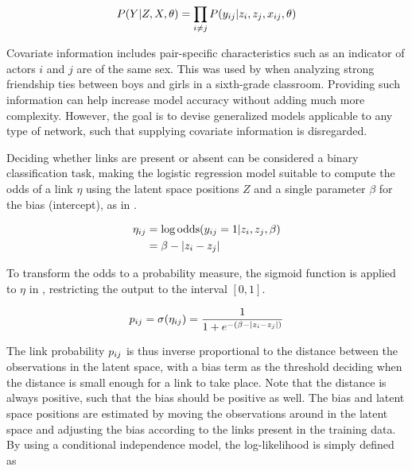         \begin{equation}\label{eq:lsm-link-proba}
            P(Y|Z,X,\theta) = \prod_{i\neq j} P(\sub(y)|z_i,z_j,\sub(x),\theta)
        \end{equation}
        
        Covariate information includes pair-specific characteristics such as an indicator of actors $i$ and $j$ are of the same sex. This was used by \citeauthor*{hoff2002latent} when analyzing strong friendship ties between boys and girls in a sixth-grade classroom. Providing such information can help increase model accuracy without adding much more complexity. However, the goal is to devise generalized models applicable to any type of network, such that supplying covariate information is disregarded. 
        
        Deciding whether links are present or absent can be considered a binary classification task, making the logistic regression model suitable to compute the odds of a link $\eta$ using the latent space positions $Z$ and a single parameter $\beta$ for the bias (intercept), as in .
        
        \begin{equation}\label{eq:lsm-link-odds}
            \begin{split}
                \sub(\eta) &= \log \odds(\sub(y)=1|z_i,z_j,\beta) \\
                           &= \beta - |z_i-z_j|
            \end{split}
        \end{equation}
        
        To transform the odds to a probability measure, the sigmoid function is applied to $\eta$ in , restricting the output to the interval $[0,1]$.
        
        \begin{equation}\label{eq:lsm-link-sigmoid}
            \sub(p) = \sigma(\sub(\eta)) = \frac{1}{1 + e^{-(\beta - |z_i-z_j|)}}
        \end{equation}
        
        The link probability $\sub(p)$ is thus inverse proportional to the distance between the observations in the latent space, with a bias term as the threshold deciding when the distance is small enough for a link to take place. Note that the distance is always positive, such that the bias should be positive as well. 
        The bias and latent space positions are estimated by moving the observations around in the latent space and adjusting the bias according to the links present in the training data.
        By using a conditional independence model, the log-likelihood is simply defined as
        
